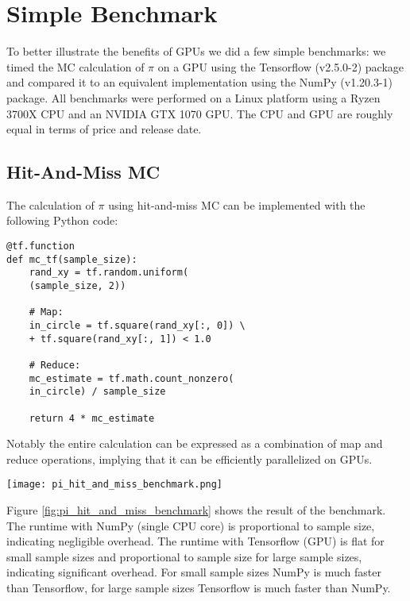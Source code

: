 \section{Simple Benchmark}
To better illustrate the benefits of GPUs we did a few simple benchmarks:
we timed the MC calculation of $\pi$ on a GPU using the Tensorflow (v2.5.0-2) package and compared it
to an equivalent implementation using the NumPy (v1.20.3-1) package.
All benchmarks were performed on a Linux platform using a Ryzen 3700X CPU and an NVIDIA GTX 1070 GPU.
The CPU and GPU are roughly equal in terms of price and release date.
\subsection{Hit-And-Miss MC}
The calculation of $\pi$ using hit-and-miss MC can be implemented with the following Python code:
\begin{lstlisting}
@tf.function
def mc_tf(sample_size):
    rand_xy = tf.random.uniform(
	(sample_size, 2))

    # Map:
    in_circle = tf.square(rand_xy[:, 0]) \
	+ tf.square(rand_xy[:, 1]) < 1.0

    # Reduce:
    mc_estimate = tf.math.count_nonzero(
	in_circle) / sample_size

    return 4 * mc_estimate
\end{lstlisting}
Notably the entire calculation can be expressed as a combination of map and reduce operations,
implying that it can be efficiently parallelized on GPUs.
\begin{figure*}
	\centering
	\texttt{[image: pi\_hit\_and\_miss\_benchmark.png]}
	\caption{
		Benchmark of hit-and-miss MC.
		Runtime with NumPy is proportional to sample size.
		Runtime with Tensorflow is constant for $N <= 10^7$.
		Runtime with Tensorflow is proportional to sample size for $N >= 10^9$
		(assuming Tensorflow is already initialized).
	}
	\label{fig:pi_hit_and_miss_benchmark}
\end{figure*}
Figure \ref{fig:pi_hit_and_miss_benchmark} shows the result of the benchmark.
The runtime with NumPy (single CPU core) is proportional to sample size, indicating negligible overhead.
The runtime with Tensorflow (GPU) is flat for small sample sizes and proportional to sample size for large sample sizes,
indicating significant overhead.
For small sample sizes NumPy is much faster than Tensorflow, for large sample sizes Tensorflow is much faster than NumPy.

